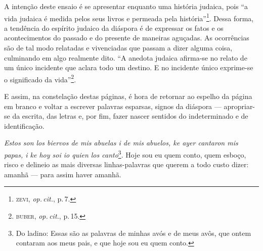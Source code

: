 \begin{center}\end{center}

\noindent{}A intenção deste ensaio é se apresentar enquanto uma história judaica,
pois ``a vida judaica é medida pelos seus livros e permeada pela
história''\footnote{\textsc{zevi}, \emph{op.\,cit.}, p.\,7.}. Dessa forma, a tendência do
espírito judaico da diáspora é de expressar os fatos e os acontecimentos
do passado e do presente de maneiras aguçadas. As ocorrências são de tal
modo relatadas e vivenciadas que passam a dizer alguma coisa, culminando
em algo realmente dito. ``A anedota judaica afirma-se no relato de
um único incidente que aclara todo um destino. E no incidente único
exprime-se o significado da vida''\footnote{\textsc{buber}, \emph{op.\,cit.}, p.\,15.}.

E assim, na constelação destas páginas, é hora de retornar ao espelho da
página em branco e voltar a escrever palavras esparsas, signos da
diáspora --- apropriar-se da escrita, das letras e, por fim, fazer
nascer sentidos do indeterminado e de identificação.

\emph{Estos son los biervos de mis abuelas i de mis abuelos, ke ayer
cantaron mis papas, i ke hoy soi io quien los canto}\footnote{Do
  ladino: Essas são as palavras de minhas avós e de meus avôs,
  que ontem contaram aos meus pais, e que hoje sou eu quem conto.}. Hoje
sou eu quem conto, quem esboço, risco e delineio as mais diversas
linhas-palavras que querem a todo custo dizer: amanhã --- para assim
haver amanhã.


